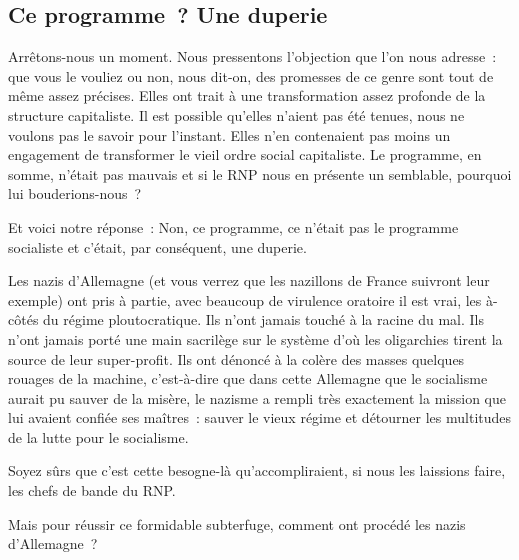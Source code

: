 \documentclass[french,twoside]{book} %
\begin{document}
\subsection[Ce programme ? Une duperie]{Ce programme ? Une duperie}
\noindent Arrêtons-nous un moment. Nous pressentons l’objection que l’on nous adresse : que vous le vouliez ou non, nous dit-on, des promesses de ce genre sont tout de même assez précises. Elles ont trait à une transformation assez profonde de la structure capitaliste. Il est possible qu’elles n’aient pas été tenues, nous ne voulons pas le savoir pour l’instant. Elles n’en contenaient pas moins un engagement de transformer le vieil ordre social capitaliste. Le programme, en somme, n’était pas mauvais et si le RNP nous en présente un semblable, pourquoi lui bouderions-nous ?\par
Et voici notre réponse : Non, ce programme, ce n’était pas le programme socialiste et c’était, par conséquent, une duperie.\par
Les nazis d’Allemagne (et vous verrez que les nazillons de France suivront leur exemple) ont pris à partie, avec beaucoup de virulence oratoire il est vrai, les à-côtés du régime ploutocratique. Ils n’ont jamais touché à la racine du mal. Ils n’ont jamais porté une main sacrilège sur le système d’où les oligarchies tirent la source de leur super-profit. Ils ont dénoncé à la colère des masses quelques rouages de la machine, c’est-à-dire que dans cette Allemagne que le socialisme aurait pu sauver de la misère, le nazisme a rempli très exactement la mission que lui avaient confiée ses maîtres : sauver le vieux régime et détourner les multitudes de la lutte pour le socialisme.\par
Soyez sûrs que c’est cette besogne-là qu’accompliraient, si nous les laissions faire, les chefs de bande du RNP.\par
Mais pour réussir ce formidable subterfuge, comment ont procédé les nazis d’Allemagne ?
\end{document}

